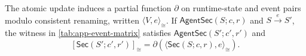 \begin{lemma}
\label{lem:app-event-derivative}
The atomic update induces a partial function \(\partial\) on runtime-state and event pairs modulo consistent renaming, written \(\langle V,e\rangle_{\cong}\).
If \(\mathsf{AgentSec}(S;c,r)\) and \(S\xrightarrow eS'\), the witness in \cref{tab:app-event-matrix} satisfies \(\mathsf{AgentSec}(S';c',r')\) and
\[
 [\mathsf{Sec}(S';c',r')]_{\cong}
 =\partial(\langle\mathsf{Sec}(S;c,r),e\rangle_{\cong}).
\]
\end{lemma}

